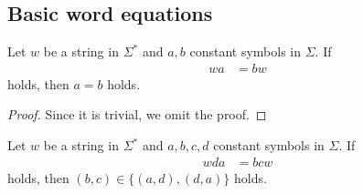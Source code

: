 \subsection{Basic word equations}\label{subsec:basiceq}

\newcommand{\pair}[2]{(#1,#2)}

\begin{prop}\label{prop:repstring_origin}
  Let $w$ be a string in $\Sigma^{\ast}$ 
 and $a,b$ constant symbols in $\Sigma$.
  If
  \begin{align}
  wa & = bw\label{eq:repstring_origin}
  \end{align}
  holds, then $a = b$ holds.
\end{prop}

\begin{proof}
Since it is trivial, we omit the proof.
\end{proof}

\begin{prop}\label{prop:repstring_base}
Let $w$ be a string in $\Sigma^{\ast}$ 
and $a,b,c,d$ constant symbols in $\Sigma$.
If
\begin{align}
wda & = bcw\label{eq:repstring_base}
\end{align}
holds, then $\pair{b}{c} \in \{\pair{a}{d}, \pair{d}{a}\}$ holds.
\end{prop}

